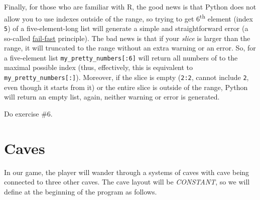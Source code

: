\documentclass[
]{book}
\begin{document}
Finally, for those who are familiar with R, the good news is that Python does not allow you to use indexes outside of the range, so trying to get 6\textsuperscript{th} element (index \texttt{5}) of a five-element-long list will generate a simple and straightforward error (a so-called \href{https://en.wikipedia.org/wiki/Fail-fast}{fail-fast} principle). The bad news is that if your \emph{slice} is larger than the range, it will truncated to the range without an extra warning or an error. So, for a five-element list \texttt{my\_pretty\_numbers{[}:6{]}} will return all numbers of to the maximal possible index (thus, effectively, this is equivalent to \texttt{my\_pretty\_numbers{[}:{]}}). Moreover, if the slice is empty (\texttt{2:2}, cannot include \texttt{2}, even though it starts from it) or the entire slice is outside of the range, Python will return an empty list, again, neither warning or error is generated.

Do exercise \#6.

\hypertarget{caves}{%
\section{Caves}\label{caves}}

In our game, the player will wander through a systems of caves with cave being connected to three other caves. The cave layout will be \emph{CONSTANT}, so we will define at the beginning of the program as follows.
\end{document}
